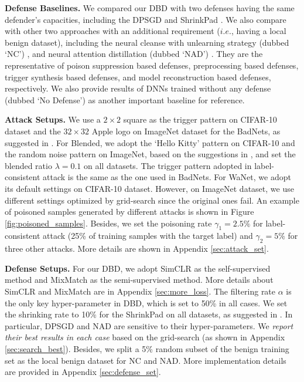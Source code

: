 \noindent \textbf{Defense Baselines.} 
We compared our DBD with two defenses having the same defender's capacities, including the DPSGD \citep{du2019robust} and ShrinkPad \citep{li2021backdoor2}. %
We also compare with other two approaches with an additional requirement ($i.e.$, having a local benign dataset), including the neural cleanse with unlearning strategy (dubbed `NC') \citep{wang2019neural}, and neural attention distillation (dubbed `NAD') \citep{li2021neural}. %
They are the representative of poison suppression based defenses, preprocessing based defenses, trigger synthesis based defenses, and model reconstruction based defenses, respectively. We also provide results of DNNs trained without any defense (dubbed `No Defense') as another important baseline for reference.

\noindent \textbf{Attack Setups.} 
We use a $2\times 2$ square as the trigger pattern on CIFAR-10 dataset and the $32 \times 32$ Apple logo on ImageNet dataset for the BadNets, as suggested in \citep{gu2017badnets,wang2019neural}. For Blended, we adopt the `Hello Kitty' pattern on CIFAR-10 and the random noise pattern on ImageNet, based on the suggestions in \citep{chen2017targeted}, and set the blended ratio $\lambda = 0.1$ on all datasets. The trigger pattern adopted in label-consistent attack is the same as the one used in BadNets. For WaNet, we adopt its default settings on CIFAR-10 dataset. However, on ImageNet dataset, we use different settings optimized by grid-search since the original ones fail. An example of poisoned samples generated by different attacks is shown in Figure \ref{fig:poisoned_samples}. Besides, we set the poisoning rate $\gamma_1=2.5\%$ for label-consistent attack (25\% of training samples with the target label) and $\gamma_2= 5\%$ for three other attacks. More details are shown in Appendix \ref{sec:attack_set}.

\noindent \textbf{Defense Setups.} 
For our DBD, we adopt SimCLR \citep{chen2020simple} as the self-supervised method and MixMatch \citep{berthelot2019mixmatch} as the semi-supervised method. More details about SimCLR and MixMatch are in Appendix \ref{sec:more_loss}. The filtering rate $\alpha$ is the only key hyper-parameter in DBD, which is set to 50\% in all cases. We set the shrinking rate to 10\% for the ShrinkPad on all datasets, as suggested in \citep{li2021backdoor2,zeng2021deepsweep}. In particular, DPSGD and NAD are sensitive to their hyper-parameters. We \emph{report their best results in each case} based on the grid-search (as shown in Appendix \ref{sec:search_best}). Besides, we split a 5\% random subset of the benign training set as the local benign dataset for NC and NAD. More implementation details are provided in Appendix \ref{sec:defense_set}.

